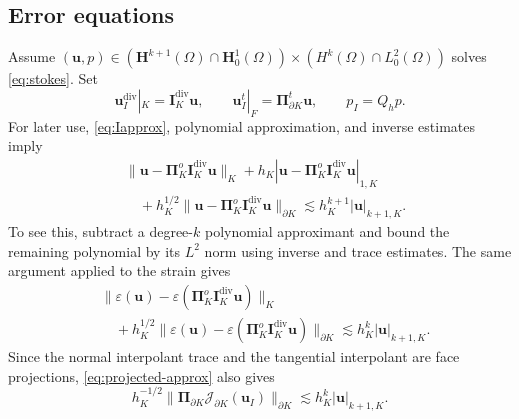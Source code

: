 \documentclass[review,hidelinks,onefignum,onetabnum]{siamart251216}
\newcommand{\AI}[1]{{\color{blue}#1}}
\begin{document}
\subsection{Error equations}
Assume $(\boldsymbol u,p)\in
(\boldsymbol H^{k+1}(\Omega)\cap\boldsymbol H_0^1(\Omega))\times
(H^k(\Omega)\cap L_0^2(\Omega))$ solves \eqref{eq:stokes}.
Set
\[
\boldsymbol u_I^{\operatorname{div}}|_K=\boldsymbol I_K^{\operatorname{div}}\boldsymbol u,
\qquad \boldsymbol u_I^t|_F=\boldsymbol\Pi_{\partial K}^t\boldsymbol u,
\qquad p_I=Q_hp.
\]
\AI{For later use, \eqref{eq:Iapprox}, polynomial approximation, and inverse
estimates imply
\begin{equation}\label{eq:projected-approx}
\begin{aligned}
&\|\boldsymbol u-\boldsymbol\Pi_K^o\boldsymbol I_K^{\operatorname{div}}\boldsymbol u\|_K
+h_K|\boldsymbol u-\boldsymbol\Pi_K^o\boldsymbol I_K^{\operatorname{div}}\boldsymbol u|_{1,K}\\
&\quad+h_K^{1/2}\|\boldsymbol u-\boldsymbol\Pi_K^o\boldsymbol I_K^{\operatorname{div}}\boldsymbol u\|_{\partial K}
\lesssim h_K^{k+1}|\boldsymbol u|_{k+1,K}.
\end{aligned}
\end{equation}
To see this, subtract a degree-$k$ polynomial approximant and bound the
remaining polynomial by its $L^2$ norm using inverse and trace estimates.
The same argument applied to the strain gives
\begin{equation}\label{eq:strain-approx}
\begin{aligned}
&\|\varepsilon(\boldsymbol u)-\varepsilon(\boldsymbol\Pi_K^o
\boldsymbol I_K^{\operatorname{div}}\boldsymbol u)\|_K\\
&\quad+h_K^{1/2}\|\varepsilon(\boldsymbol u)-\varepsilon(\boldsymbol\Pi_K^o
\boldsymbol I_K^{\operatorname{div}}\boldsymbol u)\|_{\partial K}
\lesssim h_K^k|\boldsymbol u|_{k+1,K}.
\end{aligned}
\end{equation}
Since the normal interpolant trace and the tangential interpolant are face
projections, \eqref{eq:projected-approx} also gives
\begin{equation}\label{eq:interpolant-jump}
h_K^{-1/2}\|\boldsymbol\Pi_{\partial K}\mathcal J_{\partial K}(\boldsymbol u_I)\|_{\partial K}
\lesssim h_K^k|\boldsymbol u|_{k+1,K}.
\end{equation}}
\end{document}
